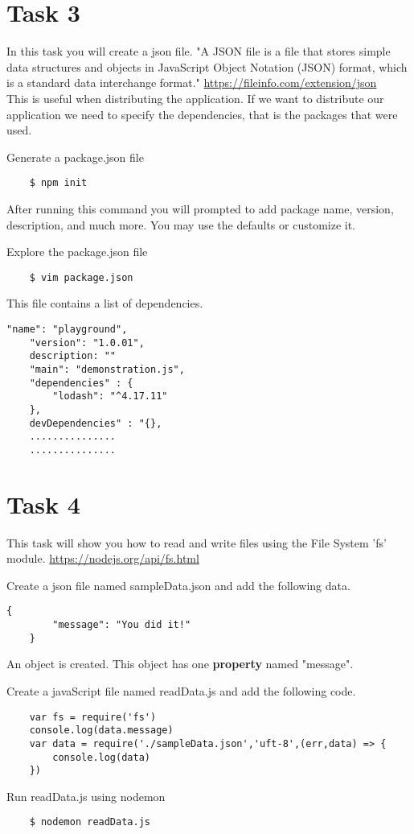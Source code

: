 \documentclass[12pt]{article}
\begin{document}
\section*{Task 3}
In this task you will create a json file. "A JSON file is a file that stores simple data structures and objects in JavaScript Object Notation (JSON) format, which is a standard data interchange format." \href{https://fileinfo.com/extension/json}{https://fileinfo.com/extension/json} \\
This is useful when distributing the application. If we want to distribute our application we need to specify the dependencies, that is the packages that were used. 
\begin{todolist}
    \item Generate a package.json file 
    \begin{lstlisting}
    $ npm init 
    \end{lstlisting}
    After running this command you will prompted to add package name, version, description, and much more. You may use the defaults or customize it. 
    \item Explore the package.json file 
    \begin{lstlisting}
    $ vim package.json 
    \end{lstlisting}
    This file contains a list of dependencies. 
    \begin{lstlisting}[title={package.json}]
    "name": "playground",
    "version": "1.0.01",
    description: ""
    "main": "demonstration.js",
    "dependencies" : {
        "lodash": "^4.17.11"
    },
    devDependencies" : "{},
    ...............
    ...............
    \end{lstlisting}
\end{todolist}
\section*{Task 4}
This task will show you how to read and write files using the File System 'fs' module. \href{https://nodejs.org/api/fs.html}{https://nodejs.org/api/fs.html}
\begin{todolist}
    \item Create a json file named sampleData.json and add the following data. 
    \begin{lstlisting}[title={sampleData.json}]
    {
        "message": "You did it!"
    }
    \end{lstlisting} 
    An object is created. This object has one \textbf{property} named "message". 
    \item Create a javaScript file named readData.js and add the following code. 
    \begin{lstlisting}
    var fs = require('fs')
    console.log(data.message)
    var data = require('./sampleData.json','uft-8',(err,data) => {
        console.log(data)
    })
    \end{lstlisting}
    \item Run readData.js using nodemon 
    \begin{lstlisting}
    $ nodemon readData.js
    \end{lstlisting} 
\end{todolist}
\end{document}
